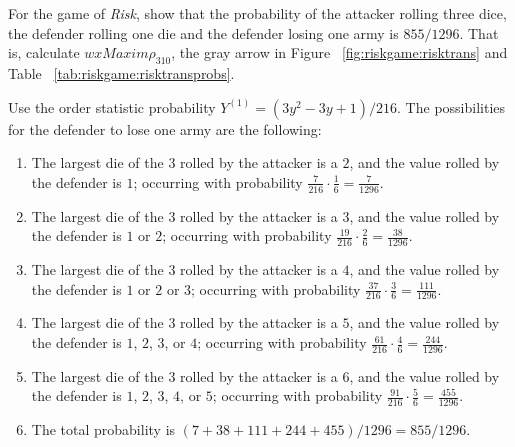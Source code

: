 \documentclass[12pt]{article}
\begin{document}
\begin{exercise}
    For the game of \emph{Risk}, show that the probability of the
    attacker rolling three dice, the defender rolling one die and the
    defender losing one army is \( 855/1296 \).  That is, calculate \(
    wxMaxim \rho_{310} \), the gray arrow in Figure~%
    \ref{fig:riskgame:risktrans} and Table~%
    \ref{tab:riskgame:risktransprobs}.
\end{exercise}
\begin{solution}
    Use the order statistic probability \( Y^{(1)} = (3y^2 - 3 y + 1)/216
    \).  The possibilities for the defender to lose one army are the
    following:
    \begin{enumerate}[label=(\alph*)]
    \item
        The largest die of the \( 3 \) rolled by the attacker is a \( 2 \),
        and the value rolled by the defender is \( 1 \); occurring with
        probability \( \frac{7}{216} \cdot \frac{1}{6} = \frac{7}{1296} \).
    \item
        The largest die of the \( 3 \) rolled by the attacker is a \( 3 \),
        and the value rolled by the defender is \( 1 \) or \( 2 \);
        occurring with probability \( \frac{19}{216} \cdot \frac{2}{6} =
        \frac{38}{1296} \).
    \item
        The largest die of the \( 3 \) rolled by the attacker is a \( 4 \),
        and the value rolled by the defender is \( 1 \) or \( 2 \) or \(
        3 \); occurring with probability \( \frac{37}{216} \cdot \frac{3}
        {6} = \frac{111}{1296} \).
    \item
        The largest die of the \( 3 \) rolled by the attacker is a \( 5 \),
        and the value rolled by the defender is \( 1 \), \( 2 \), \( 3 \),
        or \( 4 \); occurring with probability \( \frac{61}{216} \cdot
        \frac{4}{6} = \frac{244}{1296} \).
    \item
        The largest die of the \( 3 \) rolled by the attacker is a \( 6 \),
        and the value rolled by the defender is \( 1 \), \( 2 \), \( 3 \),
        \( 4 \), or \( 5 \); occurring with probability \( \frac{91}{216}
        \cdot \frac{5} {6} = \frac{455}{1296} \).
    \item
        The total probability is \( (7 + 38 + 111 + 244 + 455)/1296 =
        855/1296 \).
\end{enumerate}
\end{solution}
\end{document}
